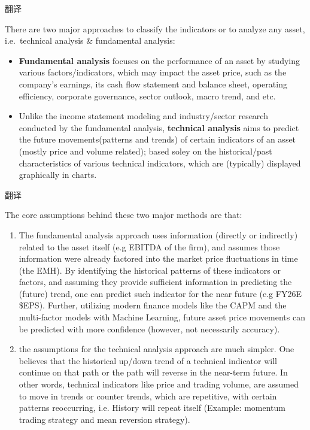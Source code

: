 \documentclass[
]{book}
\begin{document}
翻译

There are two major approaches to classify the indicators or to analyze
any asset, i.e.~technical analysis \& fundamental analysis:

\begin{itemize}
\item
  \textbf{Fundamental analysis} focuses on the performance of an asset
  by studying various factors/indicators, which may impact the asset
  price, such as the company's earnings, its cash flow statement and
  balance sheet, operating efficiency, corporate governance, sector
  outlook, macro trend, and etc.
\item
  Unlike the income statement modeling and industry/sector research
  conducted by the fundamental analysis, \textbf{technical analysis}
  aims to predict the future movements(patterns and trends) of certain
  indicators of an asset (mostly price and volume related); based soley
  on the historical/past characteristics of various technical
  indicators, which are (typically) displayed graphically in charts.
\end{itemize}

翻译

The core assumptions behind these two major methods are that:

\begin{enumerate}
\def\labelenumi{(\arabic{enumi})}
\item
  The fundamental analysis approach uses information (directly or
  indirectly) related to the asset itself (e.g EBITDA of the firm), and
  assumes those information were already factored into the market price
  fluctuations in time (the EMH). By identifying the historical patterns
  of these indicators or factors, and assuming they provide sufficient
  information in predicting the (future) trend, one can predict such
  indicator for the near future (e.g FY26E \$EPS). Further, utilizing
  modern finance models like the CAPM and the multi-factor models with
  Machine Learning, future asset price movements can be predicted with
  more confidence (however, not necessarily accuracy).
\item
  the assumptions for the technical analysis approach are much simpler.
  One believes that the historical up/down trend of a technical
  indicator will continue on that path or the path will reverse in the
  near-term future. In other words, technical indicators like price and
  trading volume, are assumed to move in trends or counter trends, which
  are repetitive, with certain patterns reoccurring, i.e. History will
  repeat itself (Example: momentum trading strategy and mean reversion
  strategy).
\end{enumerate}
\end{document}
